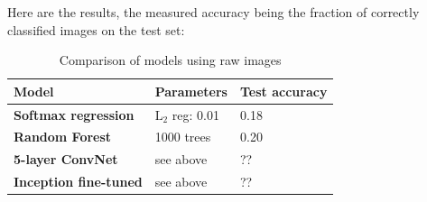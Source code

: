 Here are the results, the measured accuracy being the fraction of correctly classified images on the test set:
\begin{table}[H]
\begin{center}
    \begin{tabular}{| l | l | p{5cm} |}
    \hline
    Model & Parameters & Test accuracy \\ \hline
    \textbf{Softmax regression} & $\text{L}_2$ reg: 0.01 & 0.18  \\ \hline
    \textbf{Random Forest} & 1000 trees & 0.20 \\ \hline
    \textbf{5-layer ConvNet} & see above & ?? \\ \hline
    \textbf{Inception fine-tuned} & see above & ?? \\
    \hline
    \end{tabular}
\end{center} 
\caption{Comparison of models using raw images}
\end{table}





